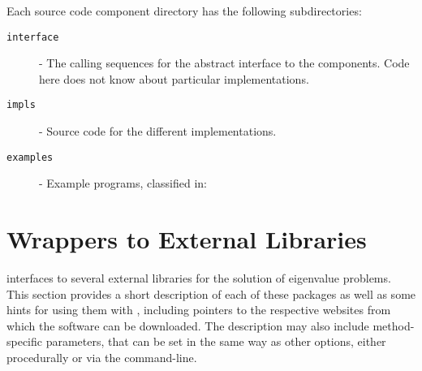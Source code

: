 
Each \slepc source code component directory has the following subdirectories:
\begin{description}
\item[\texttt{interface}] - The calling sequences for the abstract interface to the components. Code here does not know about particular implementations.
\item[\texttt{impls}] - Source code for the different implementations.
\item[\texttt{examples}] - Example programs, classified in:
\end{description}





\section{Wrappers to External Libraries}
\label{sec:wrap}

	\slepc interfaces to several external libraries for the solution of eigenvalue problems. This section provides a short description of each of these packages as well as some hints for using them with \slepc, including pointers to the respective websites from which the software can be downloaded. The description may also include method-specific parameters, that can be set in the same way as other \slepc options, either procedurally or via the command-line.

